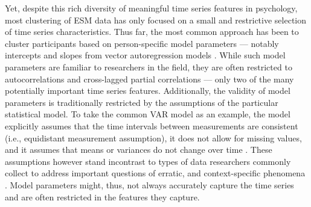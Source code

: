 \documentclass[man, 12pt, a4paper, mask, floatsintext]{apa7}
\theoremstyle{break}
\theoremstyle{plain}
\begin{document}
Yet, despite this rich diversity of meaningful time series features in psychology, most clustering of ESM data has only focused on a small and restrictive selection of time series characteristics. Thus far, the most common approach has been to cluster participants based on person-specific model parameters --- notably intercepts and slopes from vector autoregression models \citep[VAR; e.g.,][]{ariens2020, bulteel2016, stefanovic2022}. While such model parameters are familiar to researchers in the field, they are often restricted to autocorrelations and cross-lagged partial correlations \citep[e.g.,][]{bringmann2018c} --- only two of the many potentially important time series features. Additionally, the validity of model parameters is traditionally restricted by the assumptions of the particular statistical model. To take the common VAR model as an example, the model explicitly assumes that the time intervals between measurements are consistent (i.e., equidistant measurement assumption), it does not allow for missing values, and it assumes that means or variances do not change over time \citep[i.e., stationarity assumption;][]{lutkepohl2005}. These assumptions however stand incontrast to types of data researchers commonly collect to address important questions of erratic, and context-specific phenomena \citep[][]{myin-germeys2018, hamaker2017, kivela2022, helmich2020a}. Model parameters might, thus, not always accurately capture the time series and are often restricted in the features they capture.


\end{document}
